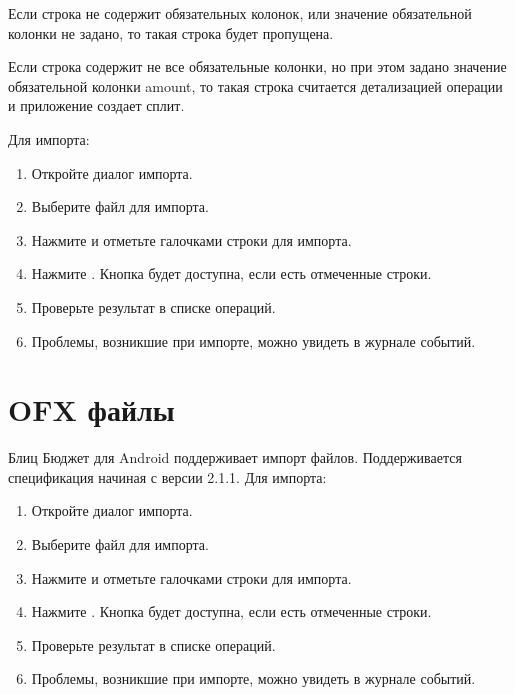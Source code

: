 \documentclass[a4paper,10pt,russian]{sphinxmanual}
\begin{document}
Если строка не содержит обязательных колонок, или значение обязательной колонки не задано, то такая
строка будет пропущена.

Если строка содержит не все обязательные колонки, но при этом задано значение обязательной колонки amount, то такая
строка считается детализацией операции и приложение создает сплит.

Для импорта:
\begin{enumerate}
\def\theenumi{\arabic{enumi}}
\def\labelenumi{\theenumi .}
\makeatletter\def\p@enumii{\p@enumi \theenumi .}\makeatother
\item {} 
Откройте диалог импорта.

\item {} 
Выберите файл для импорта.

\item {} 
Нажмите  и отметьте галочками строки для импорта.

\item {} 
Нажмите . Кнопка будет доступна, если есть отмеченные строки.

\item {} 
Проверьте результат в списке операций.

\item {} 
Проблемы, возникшие при импорте, можно увидеть в журнале событий.

\end{enumerate}

\noindent{}

\noindent{}


\section{OFX файлы}
\label{\detokenize{import:id4}}
Блиц Бюджет для Android поддерживает импорт  файлов. Поддерживается спецификация начиная с версии 2.1.1. Для импорта:
\begin{enumerate}
\def\theenumi{\arabic{enumi}}
\def\labelenumi{\theenumi .}
\makeatletter\def\p@enumii{\p@enumi \theenumi .}\makeatother
\item {} 
Откройте диалог импорта.

\item {} 
Выберите файл для импорта.

\item {} 
Нажмите  и отметьте галочками строки для импорта.

\item {} 
Нажмите . Кнопка будет доступна, если есть отмеченные строки.

\item {} 
Проверьте результат в списке операций.

\item {} 
Проблемы, возникшие при импорте, можно увидеть в журнале событий.

\end{enumerate}
\end{document}
